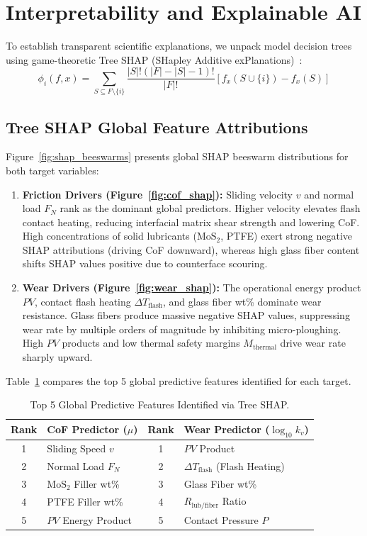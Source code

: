 \documentclass[10pt,twocolumn,a4paper]{article}
\begin{document}
\section{Interpretability and Explainable AI}
\label{sec:interpretability}

To establish transparent scientific explanations, we unpack model decision trees using game-theoretic Tree SHAP (SHapley Additive exPlanations)~\cite{lundberg2017shap}:
\begin{equation}
    \phi_i(f, x) = \sum_{S \subseteq F \setminus \{i\}} \frac{|S|!(|F| - |S| - 1)!}{|F|!} [f_x(S \cup \{i\}) - f_x(S)]
    \label{eq:shap_formula}
\end{equation}

\subsection{Tree SHAP Global Feature Attributions}
Figure~\ref{fig:shap_beeswarms} presents global SHAP beeswarm distributions for both target variables:
\begin{enumerate}
    \item \textbf{Friction Drivers (Figure~\ref{fig:cof_shap}):} Sliding velocity $v$ and normal load $F_N$ rank as the dominant global predictors. Higher velocity elevates flash contact heating, reducing interfacial matrix shear strength and lowering CoF. High concentrations of solid lubricants ($\text{MoS}_2$, PTFE) exert strong negative SHAP attributions (driving CoF downward), whereas high glass fiber content shifts SHAP values positive due to counterface scouring.
    \item \textbf{Wear Drivers (Figure~\ref{fig:wear_shap}):} The operational energy product $PV$, contact flash heating $\Delta T_{\text{flash}}$, and glass fiber wt\% dominate wear resistance. Glass fibers produce massive negative SHAP values, suppressing wear rate by multiple orders of magnitude by inhibiting micro-ploughing. High $PV$ products and low thermal safety margins $M_{\text{thermal}}$ drive wear rate sharply upward.
\end{enumerate}

Table~\ref{tab:top_features} compares the top 5 global predictive features identified for each target.

\begin{table}[t]
\centering
\caption{Top 5 Global Predictive Features Identified via Tree SHAP.}
\label{tab:top_features}
\small
\begin{tabular}{clcl}
\toprule
\textbf{Rank} & \textbf{CoF Predictor ($\mu$)} & \textbf{Rank} & \textbf{Wear Predictor ($\log_{10} k_v$)} \\
\midrule
1 & Sliding Speed $v$ & 1 & $PV$ Product \\
2 & Normal Load $F_N$ & 2 & $\Delta T_{\text{flash}}$ (Flash Heating) \\
3 & $\text{MoS}_2$ Filler wt\% & 3 & Glass Fiber wt\% \\
4 & PTFE Filler wt\% & 4 & $R_{\text{lub/fiber}}$ Ratio \\
5 & $PV$ Energy Product & 5 & Contact Pressure $P$ \\
\bottomrule
\end{tabular}
\end{table}
\end{document}

